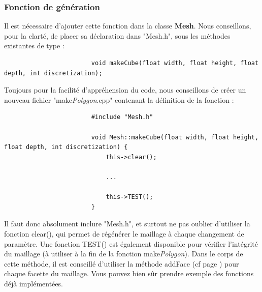 \documentclass[a4paper]{memoir}
\begin{document}
				\subsubsection{Fonction de génération}
					Il est nécessaire d'ajouter cette fonction dans la classe \textbf{Mesh}. Nous conseillons, pour la clarté, de placer sa déclaration dans 
					"Mesh.h", sous les méthodes existantes de type :
					\begin{verbatim}
						void makeCube(float width, float height, float depth, int discretization);
					\end{verbatim}
					Toujours pour la facilité d'appréhension du code, nous conseillons de créer un nouveau fichier "make\textit{Polygon}.cpp" contenant la 
					définition de la fonction :
					\begin{verbatim}
						#include "Mesh.h"

						void Mesh::makeCube(float width, float height, float depth, int discretization) {
						    this->clear();
							
						    ...
							
						    this->TEST();
						}
					\end{verbatim}
					Il faut donc absolument inclure "Mesh.h", et surtout ne pas oublier d'utiliser la fonction clear(), qui permet de régénérer le maillage à
					chaque changement de paramètre. Une fonction TEST() est également disponible pour vérifier l'intégrité du maillage (à utiliser à la fin 
					de la fonction make\textit{Polygon}). Dans le corps de cette méthode, il est conseillé d'utiliser la méthode addFace (cf page 
					\pageref{mesh-dev}) pour chaque facette du maillage. Vous pouvez bien sûr prendre exemple des fonctions déjà implémentées.
					
\end{document}

